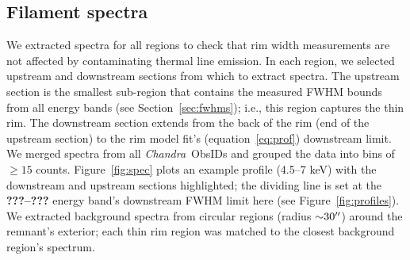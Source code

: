 \documentclass[iop, apj, numberedappendix, twocolappendix]{emulateapj}
\newcommand*{\mt}{\mathrm}
\newcommand*{\unit}[1]{\;\mt{#1}}  %
\newcommand*{\abt}{\mathord{\sim}} %
\newcommand*{\Chandra}{\textit{Chandra}\ }
\begin{document}
\subsection{Filament spectra}
\label{sec:spec}

We extracted spectra for all regions to check that rim width measurements are
not affected by contaminating thermal line emission.  In each region, we
selected upstream and downstream sections from which to extract spectra.  The
upstream section is the smallest sub-region that contains the measured FWHM
bounds from all energy bands (see Section~\ref{sec:fwhms}); i.e., this region
captures the thin rim.  The downstream section extends from the back of the rim
(end of the upstream section) to the rim model fit's (equation~\eqref{eq:prof})
downstream limit.  We merged spectra from all \Chandra ObsIDs and grouped the
data into bins of $\geq 15$ counts.  Figure~\ref{fig:spec} plots an example
profile (4.5--7 keV) with the downstream and upstream sections highlighted; the
dividing line is set at the \textbf{???--???} energy band's downstream FWHM
limit here (see Figure~\ref{fig:profiles}).
We extracted background spectra from circular regions (radius $\abt 30\arcsec$)
around the remnant's exterior; each thin rim region was matched to the closest
background region's spectrum.

\begin{figure*}
    \caption{Spectra and fits from Region 1. Left: $4.5$--$7 \unit{keV}$
    profile with highlighted downstream (blue) and upstream (grey) sections.
    Intensity units are arbitrary (a.u.).  Middle: downstream spectrum with
    absorbed power law fit; Si and S lines at $1.85$, $2.45 \unit{keV}$ are
    clearly visible.  Right: upstream spectrum with absorbed power law fit
    shows that the filament is likely free of thermal line emission.}
    \label{fig:spec}
\end{figure*}
\end{document}
